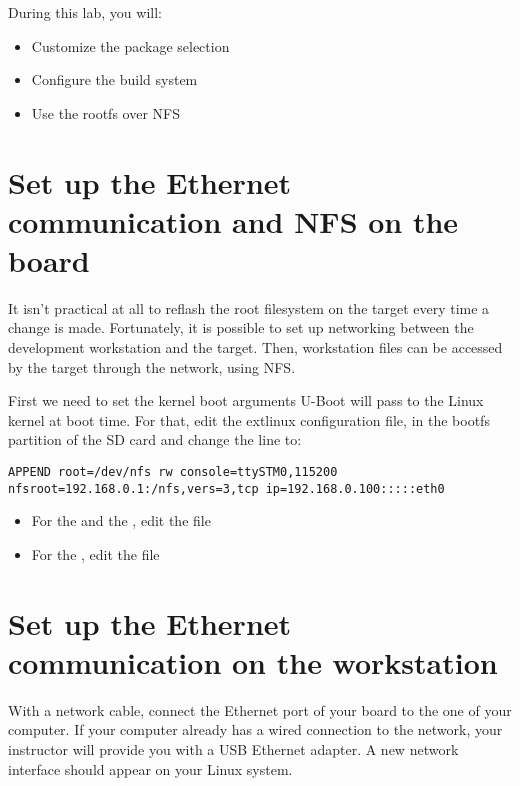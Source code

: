 
During this lab, you will:
\begin{itemize}
  \item Customize the package selection
  \item Configure the build system
  \item Use the rootfs over NFS
\end{itemize}

\section{Set up the Ethernet communication and NFS on the board}

It isn't practical at all to reflash the root filesystem on the target
every time a change is made. Fortunately, it is possible to set up
networking between the development workstation and the target. Then,
workstation files can be accessed by the target through the network,
using NFS.

First we need to set the kernel boot arguments U-Boot will pass to the
Linux kernel at boot time. For that, edit the extlinux configuration file, in
the bootfs partition of the SD card and change the  line to:

{\small
\begin{verbatim}
APPEND root=/dev/nfs rw console=ttySTM0,115200 nfsroot=192.168.0.1:/nfs,vers=3,tcp ip=192.168.0.100:::::eth0
\end{verbatim}
}

\begin{itemize}
  \item For the 
        and the , edit
        the  file
  \item For the , edit the
         file
\end{itemize}

\section{Set up the Ethernet communication on the workstation}

With a network cable, connect the Ethernet port of your board to the
one of your computer. If your computer already has a wired connection
to the network, your instructor will provide you with a USB Ethernet
adapter. A new network interface should appear on your Linux system.

